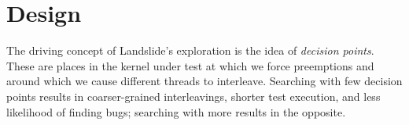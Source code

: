\documentclass{llncs}
\begin{document}





\section{Design}
\label{sec:design}

The driving concept of Landslide's exploration is the idea of {\em decision points}. These are places in the kernel under test at which we force preemptions and around which we cause different threads to interleave. Searching with few decision points results in coarser-grained interleavings, shorter test execution, and less likelihood of finding bugs; searching with more results in the opposite.
\end{document}
